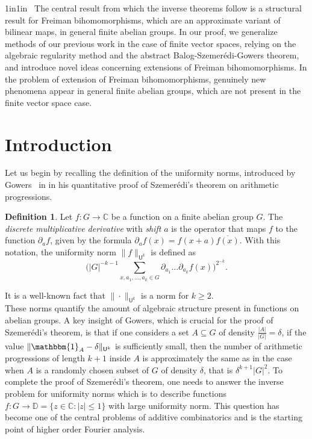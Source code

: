\documentclass[a4paper,11pt]{article}
\numberwithin{theorem}{section}
\theoremstyle{definition}
\newtheorem{defin}[theorem]{Definition}
\newcommand\id{\mathbbm{1}}
\begin{document}
\begin{changemargin}{1in}{1in}
\phantom{a}\hspace{12pt}~The central result from which the inverse theorems follow is a structural result for Freiman bihomomorphisms, which are an approximate variant of bilinear maps, in general finite abelian groups. In our proof, we generalize methods of our previous work in the case of finite vector spaces, relying on the algebraic regularity method and the abstract Balog-Szemer\'edi-Gowers theorem, and introduce novel ideas concerning extensions of Freiman bihomomorphisms. In the problem of extension of Freiman bihomomorphisms, genuinely new phenomena appear in general finite abelian groups, which are not present in the finite vector space case.\\[12pt]
\end{changemargin}
\normalsize

\section{Introduction}

\hspace{17pt}Let us begin by recalling the definition of the uniformity norms, introduced by Gowers~\cite{Gow4AP, GowerskAP} in in his quantitative proof of Szemer\'edi's theorem on arithmetic progressions.

\begin{defin}
    Let $f : G \to \mathbb{C}$ be a function on a finite abelian group $G$. The \textit{discrete multiplicative derivative} with \textit{shift} $a$ is the operator that maps $f$ to the function $\partial_a f$, given by the formula $\partial_a f(x) = f(x + a)\overline{f(x)}$. With this notation, the uniformity norm $\|f\|_{\mathsf{U}^k}$ is defined as 
    \[\Big(|G|^{-k - 1}\sum_{x, a_1, \dots, a_k \in G} \partial_{a_1} \dots \partial_{a_k} f(x)\Big)^{2^{-k}}.\]
\end{defin}

It is a well-known fact that $\|\cdot\|_{\mathsf{U}^k}$ is a norm for $k \geq 2$.\\

These norms quantify the amount of algebraic structure present in functions on abelian groups. A key insight of Gowers, which is crucial for the proof of Szemer\'edi's theorem, is that if one considers a set $A \subseteq G$ of density $\frac{|A|}{|G|} = \delta$, if the value $\|\id_A - \delta\|_{\mathsf{U}^{k}}$ is sufficiently small, then the number of arithmetic progressions of length $k + 1$ inside $A$ is approximately the same as in the case when $A$ is a randomly chosen subset of $G$ of density $\delta$, that is $\delta^{k + 1}|G|^2$. To complete the proof of Szemer\'edi's theorem, one needs to answer the inverse problem for uniformity norms which is to describe functions $f : G \to \mathbb{D} = \{z \in \mathbb{C} : |z| \leq 1\}$ with large uniformity norm. This question has become one of the central problems of additive combinatorics and is the starting point of higher order Fourier analysis.\\
\end{document}
